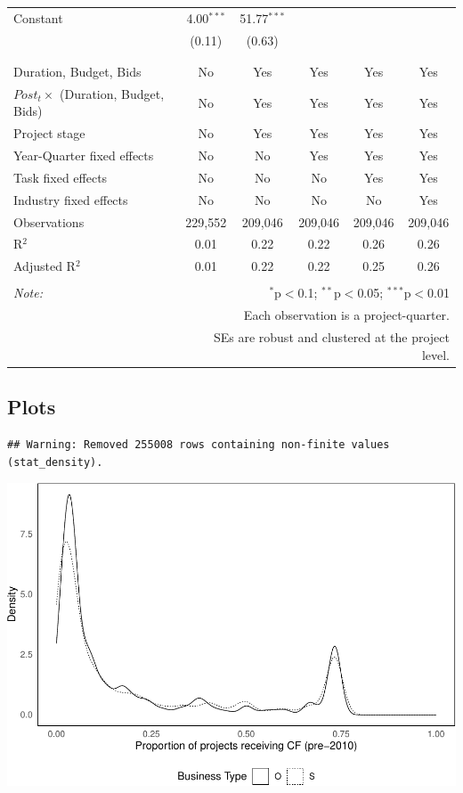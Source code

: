 \documentclass[
]{article}
\begin{document}
\begin{table}[H]
\begin{tabular}{@{\extracolsep{-2pt}}lccccc}
 Constant & 4.00$^{***}$ & 51.77$^{***}$ &  &  &  \\ 
  & (0.11) & (0.63) &  &  &  \\ 
  & & & & & \\ 
\hline \\[-1.8ex] 
Duration, Budget, Bids & No & Yes & Yes & Yes & Yes \\ 
$Post_t \times $  (Duration, Budget, Bids) & No & Yes & Yes & Yes & Yes \\ 
Project stage & No & Yes & Yes & Yes & Yes \\ 
Year-Quarter fixed effects & No & No & Yes & Yes & Yes \\ 
Task fixed effects & No & No & No & Yes & Yes \\ 
Industry fixed effects & No & No & No & No & Yes \\ 
Observations & 229,552 & 209,046 & 209,046 & 209,046 & 209,046 \\ 
R$^{2}$ & 0.01 & 0.22 & 0.22 & 0.26 & 0.26 \\ 
Adjusted R$^{2}$ & 0.01 & 0.22 & 0.22 & 0.25 & 0.26 \\ 
\hline 
\hline \\[-1.8ex] 
\textit{Note:}  & \multicolumn{5}{r}{$^{*}$p$<$0.1; $^{**}$p$<$0.05; $^{***}$p$<$0.01} \\ 
 & \multicolumn{5}{r}{Each observation is a project-quarter.} \\ 
 & \multicolumn{5}{r}{SEs are robust and clustered at the project level.} \\ 
\end{tabular} 
\end{table}

\hypertarget{plots}{%
\subsection{Plots}\label{plots}}

\begin{verbatim}
## Warning: Removed 255008 rows containing non-finite values (stat_density).
\end{verbatim}

\includegraphics{qp_first_pc_delay-2_files/figure-latex/cf_plots-1.pdf}
\end{document}
